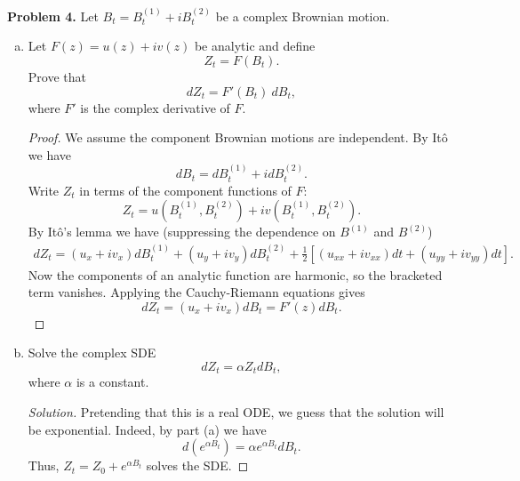 \documentclass[11pt,letterpaper]{report}
\newenvironment{solution}
{\begin{proof}[Solution]}
{\end{proof}}
\begin{document}
\noindent\textbf{Problem 4. }
Let $B_t = B^{(1)}_t + iB^{(2)}_t$ be a complex Brownian motion.
\begin{enumerate}[(a)]
	\item Let $F(z) = u(z)+iv(z)$ be analytic and define
	\[
	Z_t = F(B_t).
	\]
	Prove that
	\[
	dZ_t = F'(B_t)\ dB_t,
	\]
	where $F'$ is the complex derivative of $F$.
	\begin{proof}
		We assume the component Brownian motions are independent. By It\^o we have
		\[
		dB_t = dB^{(1)}_t + idB^{(2)}_t.
		\]
		Write $Z_t$ in terms of the component functions of $F$:
		\[
		Z_t = u(B^{(1)}_t, B^{(2)}_t) + iv(B^{(1)}_t, B^{(2)}_t).
		\]
		By It\^o's lemma we have (suppressing the dependence on $B^{(1)}$ and $B^{(2)}$)
		\begin{align*}
			dZ_t = (u_x+iv_x)dB^{(1)}_t + (u_y+iv_y)dB^{(2)}_t + \frac{1}{2}[(u_{xx}+iv_{xx})dt + (u_{yy}+iv_{yy})dt].
		\end{align*}
		Now the components of an analytic function are harmonic, so the bracketed term vanishes. Applying the Cauchy-Riemann equations gives
		\[
		dZ_t = (u_x+iv_x)dB_t = F'(z)dB_t.
		\]
	\end{proof}

	\item Solve the complex SDE
	\[
	dZ_t = \alpha Z_tdB_t,
	\]
	where $\alpha$ is a constant.
	\begin{solution}
		Pretending that this is a real ODE, we guess that the solution will be exponential. Indeed, by part (a) we have
		\[
		d(e^{\alpha B_t}) = \alpha e^{\alpha B_t}dB_t.
		\]
		Thus, $Z_t = Z_0 + e^{\alpha B_t}$ solves the SDE.
	\end{solution}
\end{enumerate}
\end{document}
